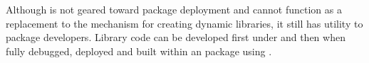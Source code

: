 Although  is not geared toward package deployment and cannot function as a replacement to the  mechanism for creating dynamic libraries, it still
has utility to package developers. Library code can be developed first under  and then when fully debugged, deployed and built within an  package using . 



\address{%
Paavo Jumppanen\\
CSIRO Marine and Atmospheric Research\\%
Castray Esplanade,\\Battery Point TAS 7004,\\Australia\\
%
\url{https://www.csiro.au}%
\\\href{mailto:paavo.jumppanen@csiro.au}{\nolinkurl{paavo.jumppanen@csiro.au}}
}
